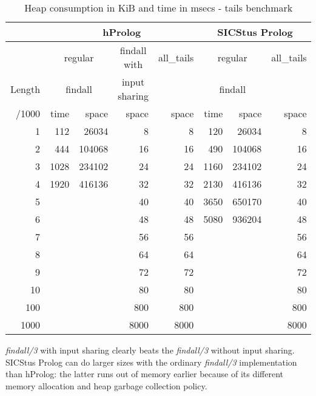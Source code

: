 \documentclass{tlp}
\begin{document}
\begin{table}[ht]
\begin{center}
\begin{tabular}{|r|r|r|r|r||r|r|r|}
\hline
       & \multicolumn{4}{c||}{hProlog} & \multicolumn{3}{c|}{SICStus Prolog}\\ \hline
       & \multicolumn{2}{c|}{regular} & \multicolumn{1}{c|}{findall with} & \multicolumn{1}{c||}{all\_tails}& \multicolumn{2}{c|}{regular       } & \multicolumn{1}{c|}{all\_tails}\\
Length & \multicolumn{2}{c|}{findall} & \multicolumn{1}{c|}{input sharing} & \multicolumn{1}{c||}{}           & \multicolumn{2}{c|}{findall       } & \multicolumn{1}{c|}{              }\\
\cline{2-8}
/1000 & time & space & space & space & time & space & space \\ 
\hline
1        &112    &  26034     &  8   &  8   &   120  &  26034  &  8   \\
2        &444    & 104068     & 16   & 16   &   490  & 104068  & 16   \\
3        &1028   & 234102     & 24   & 24   & 1160   & 234102  & 24   \\
4        &1920   & 416136     & 32   & 32   & 2130   & 416136  & 32   \\
5        &       &            & 40   & 40   & 3650   & 650170  & 40   \\
6        &       &            & 48   & 48   & 5080   & 936204  & 48   \\
7        &       &            & 56   & 56   &        &         & 56   \\
8        &       &            & 64   & 64   &        &         & 64   \\
9        &       &            & 72   & 72   &        &         & 72   \\
10       &       &            & 80   & 80   &        &         & 80   \\
100      &       &            &800   &800   &        &         &800   \\
1000     &       &            &8000  &8000  &        &         &8000  \\
\hline
\end{tabular}
\caption{Heap consumption in KiB and time in msecs - tails
  benchmark}\label{tailscombined}
\end{center}
\end{table}



{\em findall/3} with input sharing clearly beats the {\em findall/3}
without input sharing. SICStus Prolog can do larger sizes with the
ordinary {\em findall/3} implementation than hProlog: the latter runs
out of memory earlier because of its different memory allocation and
heap garbage collection policy.
\end{document}
